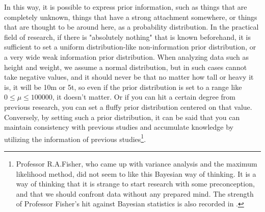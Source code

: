 \documentclass{ltjsbook}
\begin{document}
In this way, it is possible to express prior information, such as things that are completely unknown, things that have a strong attachment somewhere, or things that are thought to be around here, as a probability distribution. In the practical field of research, if there is "absolutely nothing" that is known beforehand, it is sufficient to set a uniform distribution-like non-information prior distribution, or a very wide weak information prior distribution. When analyzing data such as height and weight, we assume a normal distribution, but in such cases cannot take negative values, and it should never be that no matter how tall or heavy it is, it will be 10m or 5t, so even if the prior distribution is set to a range like $0\le \mu \le 100000$, it doesn't matter. Or if you can hit a certain degree from previous research, you can set a fluffy prior distribution centered on that value. Conversely, by setting such a prior distribution, it can be said that you can maintain consistency with previous studies and accumulate knowledge by utilizing the information of previous studies\footnote{Professor R.A.Fisher, who came up with variance analysis and the maximum likelihood method, did not seem to like this Bayesian way of thinking. It is a way of thinking that it is strange to start research with some preconception, and that we should confront data without any prepared mind. The strength of Professor Fisher's hit against Bayesian statistics is also recorded in \textcite{mcgrayne2011theory}.}.
\end{document}
